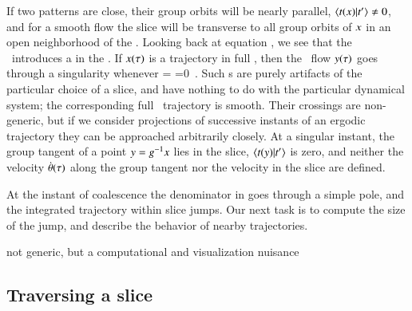 

If  two patterns are close, their group orbits will be nearly parallel,
$\braket{\groupTan(\ssp)}{\sliceTan{}} \neq 0$, and for a smooth flow the
slice will be transverse to all group orbits of $x$ in an open
neighborhood of the {\template} \slicep.
Looking back at equation , we see that the \mslices\
introduces a {\sset} in the \reducedsp. If
$x(\tau)$ is a trajectory in full {\statesp}, then the \reducedsp\
flow $y(\tau)$ goes through a singularity whenever
\beq
\braket{\groupTan(\sspSing)}{\sliceTan{}}
 =
\braket{\sspSing}{\Lg^2\slicep}
 =0
\,.
Such {\sset s} are purely artifacts of the particular choice of a slice,
and have nothing to do with the particular dynamical system; the
corresponding full \statesp\ trajectory is smooth. Their crossings are
non-generic, but if we consider projections of successive instants of an
ergodic trajectory they can be approached arbitrarily closely. At a
singular instant, the group tangent of a point $y=g^{-1} x$
lies in the slice, $\braket{\groupTan(\sspRed)}{\sliceTan{}}$ is zero,
and neither the velocity $\dot{{\bf \theta}}(\tau)$ along the group tangent
nor the velocity in the slice are defined.

At the instant of
coalescence the denominator in  goes through a simple
pole, and the integrated trajectory within slice jumps. Our next task is
to compute the size of the jump, and describe the behavior of nearby
trajectories.

not generic, but a computational and visualization nuisance

\subsection{Traversing a slice {\sset}}
\label{sec:sliceSing}




